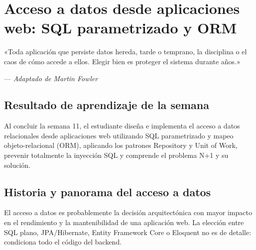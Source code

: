 \documentclass[11pt,a4paper,openany]{book}
\begin{document}
\chapter{Acceso a datos desde aplicaciones web: SQL parametrizado y ORM}
\label{cap:semana11}

\epigraph{«Toda aplicación que persiste datos hereda, tarde o
temprano, la disciplina o el caos de cómo accede a ellos. Elegir bien
es proteger el sistema durante años.»}{--- \textit{Adaptado de Martin Fowler}}

\section*{Resultado de aprendizaje de la semana}
Al concluir la semana 11, el estudiante diseña e implementa el acceso a
datos relacionales desde aplicaciones web utilizando SQL parametrizado
y mapeo objeto-relacional (ORM), aplicando los patrones Repository y
Unit of Work, prevenir totalmente la inyección SQL y comprende el
problema N+1 y su solución.

\section{Historia y panorama del acceso a datos}

El acceso a datos es probablemente la decisión arquitectónica
con mayor impacto en el rendimiento y la mantenibilidad de una
aplicación web. La elección entre SQL plano, JPA/Hibernate, Entity
Framework Core o Eloquent no es de detalle: condiciona todo el código
del backend.
\end{document}
